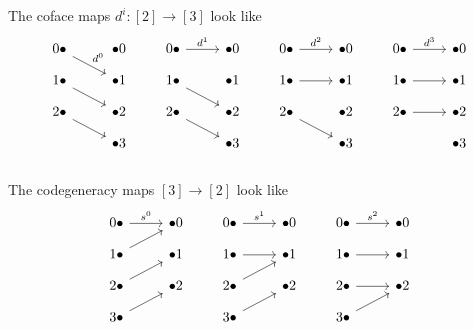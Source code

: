 \documentclass[11pt]{amsart}
\begin{document}
\begin{example} The coface maps $d^i \colon [2] \to [3]$ look like
\[ \begin{tikzcd}[row sep=small]
    0\bullet\ar[dr,"d^0" above right] & \bullet 0\\
    1\bullet\ar[dr] & \bullet1\\
    2\bullet\ar[dr] & \bullet2\\
    & \bullet3\\
\end{tikzcd} \qquad \begin{tikzcd}[row sep=small]
    0\bullet\rar["d^1" above] & \bullet 0\\
    1\bullet\ar[dr] & \bullet1\\
    2\bullet\ar[dr] & \bullet2\\
    & \bullet3\\
\end{tikzcd} \qquad \begin{tikzcd}[row sep=small]
    0\bullet\rar["d^2" above] & \bullet 0\\
    1\bullet\rar & \bullet1\\
    2\bullet\ar[dr] & \bullet2\\
    & \bullet3\\
\end{tikzcd} \qquad \begin{tikzcd}[row sep=small]
    0\bullet\rar["d^3" above] & \bullet 0\\
    1\bullet\rar & \bullet1\\
    2\bullet\rar & \bullet2\\
    & \bullet3\\
\end{tikzcd} \]
\end{example}
\begin{example} The codegeneracy maps $[3] \to [2]$ look like
\[ \begin{tikzcd}[row sep=small]
    0\bullet\rar["s^0" above] & \bullet 0\\
    1\bullet\ar[ur] & \bullet1\\
    2\bullet\ar[ur] & \bullet2\\
    3\bullet\ar[ur]& \\
\end{tikzcd} \qquad
\begin{tikzcd}[row sep=small]
    0\bullet\rar["s^1" above] & \bullet 0\\
    1\bullet\rar & \bullet1\\
    2\bullet\ar[ur] & \bullet2\\
    3\bullet\ar[ur]& \\
\end{tikzcd} \qquad 
\begin{tikzcd}[row sep=small]
    0\bullet\rar["s^2" above] & \bullet 0\\
    1\bullet\rar & \bullet1\\
    2\bullet\rar & \bullet2\\
    3\bullet\ar[ur]& \\
\end{tikzcd} \]
\end{example}
\end{document}
